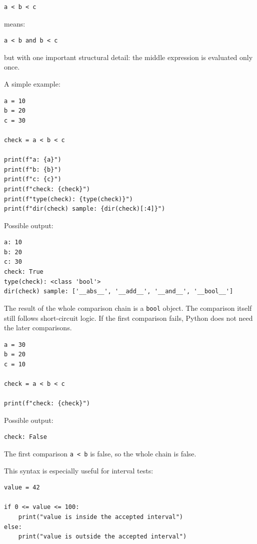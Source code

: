 \begin{verbatim}
a < b < c
\end{verbatim}

means:

\begin{verbatim}
a < b and b < c
\end{verbatim}

but with one important structural detail: the middle expression is evaluated only once.

A simple example:

\begin{verbatim}
a = 10
b = 20
c = 30

check = a < b < c

print(f"a: {a}")
print(f"b: {b}")
print(f"c: {c}")
print(f"check: {check}")
print(f"type(check): {type(check)}")
print(f"dir(check) sample: {dir(check)[:4]}")
\end{verbatim}

Possible output:

\begin{verbatim}
a: 10
b: 20
c: 30
check: True
type(check): <class 'bool'>
dir(check) sample: ['__abs__', '__add__', '__and__', '__bool__']
\end{verbatim}

The result of the whole comparison chain is a \texttt{bool} object. The comparison itself still follows short-circuit logic. If the first comparison fails, Python does not need the later comparisons.

\begin{verbatim}
a = 30
b = 20
c = 10

check = a < b < c

print(f"check: {check}")
\end{verbatim}

Possible output:

\begin{verbatim}
check: False
\end{verbatim}

The first comparison \texttt{a < b} is false, so the whole chain is false.

This syntax is especially useful for interval tests:

\begin{verbatim}
value = 42

if 0 <= value <= 100:
    print("value is inside the accepted interval")
else:
    print("value is outside the accepted interval")
\end{verbatim}


